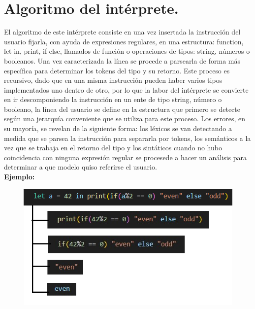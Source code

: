 \documentclass[12pt, letterpaper]{article}
\begin{document}
\section{Algoritmo del intérprete.}
El algoritmo de este intérprete consiste en una vez insertada la instrucción del usuario fijarla, con ayuda de expresiones regulares, en una estructura: function, 
let-in, print, if-else, llamados de función o operaciones de tipos: string, números o booleanos. Una vez caracterizada la línea se procede a parsearla de forma más 
específica para determinar los tokens del tipo y su retorno. Este proceso es recursivo, dado que en una misma instrucción pueden haber varios tipos implementados
uno dentro de otro, por lo que la labor del intérprete se convierte en ir descomponiendo la instrucción en un ente de tipo string, número o booleano, la línea del 
usuario se define en la estructura que primero se detecte según una jerarquía conveniente que se utiliza para este proceso. Los errores, en su mayoría, se revelan de 
la siguiente forma: los léxicos se van detectando a medida que se parsea la instrucción para separarla por tokens, los semánticos a la vez que se trabaja en el retorno 
del tipo y los sintáticos cuando no hubo coincidencia con ninguna expresión regular se procesede a hacer un análisis para determinar a que modelo quiso referirse el 
usuario. \\

\textbf{Ejemplo:}
\begin{figure}[h]
    \includegraphics[scale= 0.90]{S.png}
\end{figure}

\newpage
\end{document}
